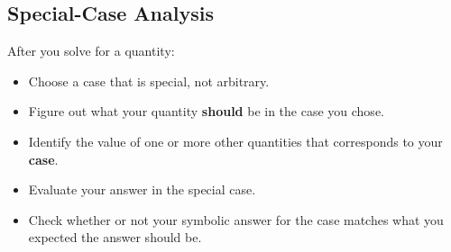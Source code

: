\documentclass[]{article}
\begin{document}
\begin{PresentSpace}
\vspace{-10pt}
\section*{Special-Case Analysis}
\vspace{-10pt}
After you solve for a quantity:
\begin{itemize}
	\item Choose a case that is special, not arbitrary.
	\item Figure out what your quantity \textbf{should} be in the case you chose.
	\item Identify the value of one or more other quantities that corresponds to your \textbf{case}.
	\item Evaluate your answer in the special case.
	\item Check whether or not your symbolic answer for the case matches what you expected the answer should be.
\end{itemize}
\end{PresentSpace}
\newpage
\end{document}
